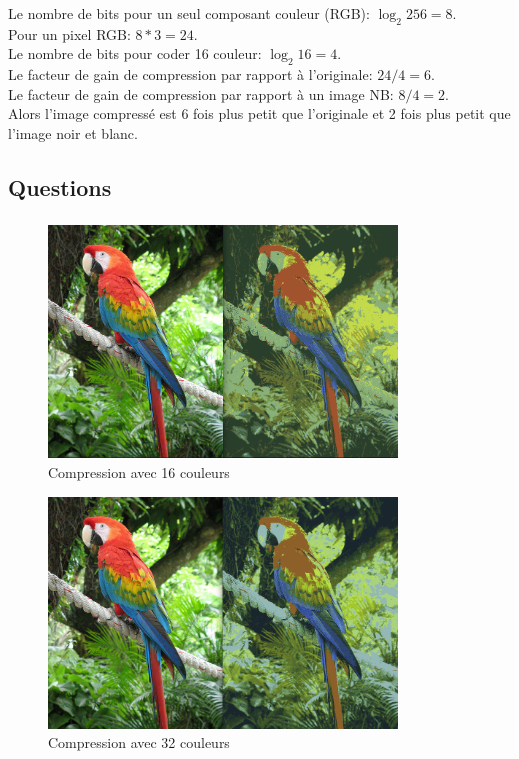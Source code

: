 \documentclass{article}
\begin{document}
\vspace{1mm}
\subsubsection{ }
Le nombre de bits pour un seul composant couleur (RGB): $\log_2{256} = 8$.\\
Pour un pixel RGB: $8 * 3 = 24$.\\
Le nombre de bits pour coder 16 couleur: $\log_2{16} = 4$.\\
Le facteur de gain de compression par rapport à l'originale: $24 / 4 = 6$.\\
Le facteur de gain de compression par rapport à un image NB: $8 / 4 = 2$.\\
Alors l'image compressé est 6 fois plus petit que l'originale et 2 fois plus
petit que l'image noir et blanc.

\subsection{Questions}
\subsubsection{ }
\begin{figure}[H]
   \centering
   \includegraphics[width=25em]{comp.png}
   \caption{Compression avec 16 couleurs}
\end{figure}

\begin{figure}[H]
   \centering
   \includegraphics[width=25em]{comp32.png}
   \caption{Compression avec 32 couleurs}
\end{figure}
\end{document}
